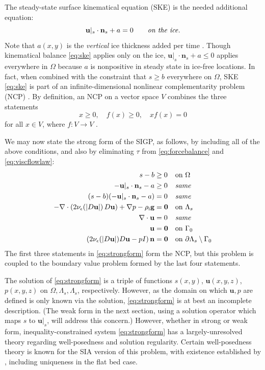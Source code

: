 \documentclass[letterpaper,final,12pt,reqno]{amsart}
\theoremstyle{claim}
\newcommand{\eps}{\epsilon}
\newcommand{\bn}{\mathbf{n}}
\newcommand{\bu}{\mathbf{u}}
\newcommand{\bzero}{\bm{0}}
\newcommand{\rhoi}{\rho_{\text{i}}}
\newcommand{\bus}{\bu|_s}
\numberwithin{equation}{section}
\numberwithin{figure}{section}
\numberwithin{table}{section}
\numberwithin{theorem}{section}
\begin{document}
The steady-state surface kinematical equation (SKE) \cite[equation (5.21)]{GreveBlatter2009} is the needed additional equation:
\begin{equation}
\bus \cdot \bn_s + a = 0 \qquad \text{\emph{on the ice}}. \label{eq:ske}
\end{equation}
Note that $a(x,y)$ is the \emph{vertical} ice thickness added per time \cite{GreveBlatter2009}.  Though kinematical balance \eqref{eq:ske} applies only on the ice, $\bus \cdot \bn_s + a \le 0$ applies everywhere in $\Omega$ because $a$ is nonpositive in steady state in ice-free locations.  In fact, when combined with the constraint that $s\ge b$ everywhere on $\Omega$, SKE \eqref{eq:ske} is part of an infinite-dimensional nonlinear complementarity problem (NCP) \cite{Bueler2021conservation}.  By definition, an NCP on a vector space $V$ combines the three statements
\begin{equation}
x\ge 0, \quad f(x)\ge 0, \quad x f(x)=0 \label{eq:ncp}
\end{equation}
for all $x\in V$, where $f:V\to V$ \cite{FacchineiPang2003}.

We may now state the strong form of the SIGP, as follows, by including all of the above conditions, and also by eliminating $\tau$ from \eqref{eq:forcebalance} and \eqref{eq:viscflowlaw}:
\begin{align}
s - b &\ge 0 && \text{on $\Omega$} \label{eq:strongform} \\
- \bu|_s \cdot \bn_s - a &\ge 0 && \text{\emph{same}} \notag \\
(s - b) (- \bu|_s \cdot \bn_s - a) &= 0 && \text{\emph{same}} \notag \\
- \nabla \cdot \left(2 \nu_\eps(|D\bu|)\, D\bu\right) + \nabla p - \rhoi \mathbf{g} &= \bzero && \text{on $\Lambda_s$} \notag \\
\nabla \cdot \bu &= 0 && \text{\emph{same}} \notag \\
\bu &= \bzero && \text{on $\Gamma_0$} \notag \\
\left(2 \nu_\eps(|D\bu|) D\bu - pI\right) \bn &= \bzero && \text{on $\partial \Lambda_s \setminus \Gamma_0$} \notag
\end{align}
The first three statements in \eqref{eq:strongform} form the NCP, but this problem is coupled to the boundary value problem formed by the last four statements.

The solution of \eqref{eq:strongform} is a triple of functions $s(x,y)$, $\bu(x,y,z)$, $p(x,y,z)$ on $\Omega,\Lambda_s,\Lambda_s$, respectively.  However, as the domain on which $\bu,p$ are defined is only known via the solution, \eqref{eq:strongform} is at best an incomplete description.  (The weak form in the next section, using a solution operator which maps $s$ to $\bu|_s$, will address this concern.)  However, whether in strong or weak form, inequality-constrained system \eqref{eq:strongform} has a largely-unresolved theory regarding well-posedness and solution regularity.  Certain well-posedness theory is known for the SIA version of this problem, with existence established by \cite{JouvetBueler2012}, including uniqueness in the flat bed case.
\end{document}
